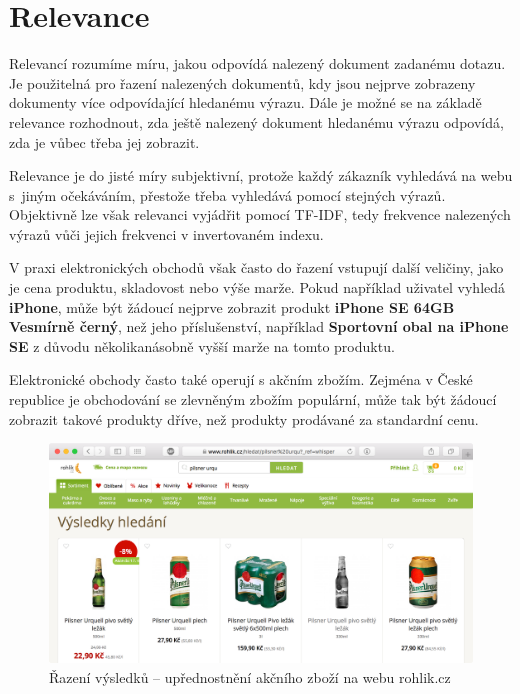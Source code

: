 \documentclass[FM,DP]{tulthesis}
\begin{document}
\section{Relevance}

Relevancí rozumíme míru, jakou odpovídá nalezený dokument zadanému dotazu.
Je použitelná pro řazení nalezených dokumentů, kdy jsou nejprve zobrazeny dokumenty
více odpovídající hledanému výrazu. Dále je možné se na základě relevance rozhodnout, 
zda ještě nalezený dokument hledanému výrazu odpovídá, zda je vůbec třeba jej zobrazit.

Relevance je do jisté míry subjektivní, protože každý zákazník vyhledává na webu
s~jiným očekáváním, přestože třeba vyhledává pomocí stejných výrazů. Objektivně lze však
relevanci vyjádřit pomocí TF-IDF, tedy frekvence nalezených výrazů vůči jejich frekvenci
v invertovaném indexu. 

V praxi elektronických obchodů však často do řazení
vstupují další veličiny, jako je cena produktu, skladovost nebo výše marže.
Pokud například uživatel vyhledá \textbf{iPhone}, může být žádoucí nejprve zobrazit
produkt \textbf{iPhone SE 64GB Vesmírně černý}, než jeho příslušenství, například
\textbf{Sportovní obal na iPhone SE} z důvodu několikanásobně vyšší marže na tomto produktu.

Elektronické obchody často také operují s akčním zbožím. Zejména v České republice je
obchodování se zlevněným zbožím populární, může tak být žádoucí zobrazit takové produkty
dříve, než produkty prodávané za standardní cenu.

\begin{figure}[h]
\center
\includegraphics[width=\textwidth]{relevance.png}
\caption[Řazení výsledků]{Řazení výsledků -- upřednostnění akčního zboží na webu rohlik.cz}
\label{relevance}
\end{figure}
\end{document}
